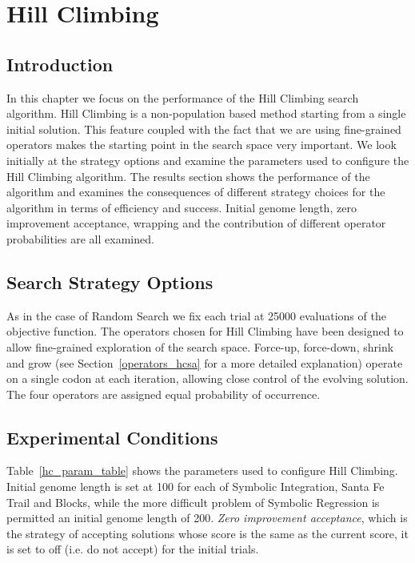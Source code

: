 \chapter{Hill Climbing}
\section{Introduction}
In this chapter we focus on the performance of the Hill Climbing search algorithm. Hill Climbing is a non-population based method starting from a single initial solution. This feature coupled with the fact that we are using fine-grained operators makes the starting point in the search space very important. We look initially at the strategy options and examine the parameters used to configure the Hill Climbing algorithm. The results section shows the performance of the algorithm and examines the consequences of different strategy choices for the algorithm in terms of efficiency and success. Initial genome length, zero improvement acceptance, wrapping and the contribution of different operator probabilities are all examined. 



\section{Search Strategy Options}
As in the case of Random Search we fix each trial at 25000 evaluations of the objective function. The operators chosen for Hill Climbing have been designed to allow fine-grained exploration of the search space. Force-up, force-down, shrink and grow (see Section~\ref{operators_hcsa} for a more detailed explanation) operate on a single codon at each iteration, allowing close control of the evolving solution. The four operators are assigned equal probability of occurrence. 



\section{Experimental Conditions}
Table~\ref{hc_param_table} shows the parameters used to configure Hill Climbing. Initial genome length is set at 100 for each of Symbolic Integration, Santa Fe Trail and Blocks, while the more difficult problem of Symbolic Regression is permitted an initial genome length of 200. \emph{Zero improvement acceptance}, which is the strategy of accepting solutions whose score is the same as the current score, it is set to off (i.e. do not accept) for the initial trials. 



